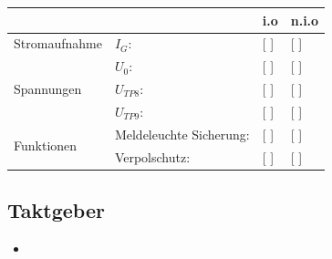 \documentclass[a4paper,11pt]{scrartcl}
\begin{document}
\renewcommand{\arraystretch}{2}
\begin{tabularx}{\textwidth}{p{}| p{} | p{} | p{}}

 &  & i.o & n.i.o \\

\hline

Stromaufnahme & $I_{G}$: & [ ] & [ ] \\

\hline

\multirow{3}{*}{Spannungen}
		& $U_{0}$:					&	[ ] & [ ] 	\\
		& $U_{TP8}$: 				&	[ ]	& [ ] 	\\
		& $U_{TP9}$: 				&	[ ] & [ ]  	\\
		
\hline		
		
\multirow{2}{*}{Funktionen}
		& Meldeleuchte Sicherung:  	& [ ] & [ ] 	\\
		& Verpolschutz:				& [ ] & [ ] 	\\ 

\end{tabularx}
\renewcommand{\arraystretch}{1}



\subsection{Taktgeber}


\begin{itemize}
	\item
\end{itemize}
\end{document}
